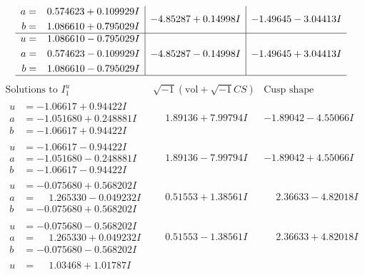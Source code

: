 \documentclass[1p]{elsarticle_modified}
\theoremstyle{definition}
\newcommand{\I}{\sqrt{-1}}
\begin{document}
$$\begin{array}{c|c|c}
\begin{aligned}
a &= \phantom{-}0.574623 + 0.109929 I \\
b &= \phantom{-}1.086610 + 0.795029 I\end{aligned}
 & -4.85287 + 0.14998 I & -1.49645 - 3.04413 I \\ \hline\begin{aligned}
u &= \phantom{-}1.086610 - 0.795029 I \\
a &= \phantom{-}0.574623 - 0.109929 I \\
b &= \phantom{-}1.086610 - 0.795029 I\end{aligned}
 & -4.85287 - 0.14998 I & -1.49645 + 3.04413 I\\
 \hline 
 \end{array}$$\newpage$$\begin{array}{c|c|c}  
\text{Solutions to }I^u_{1}& \I (\text{vol} + \sqrt{-1}CS) & \text{Cusp shape}\\
 \hline 
\begin{aligned}
u &= -1.06617 + 0.94422 I \\
a &= -1.051680 + 0.248881 I \\
b &= -1.06617 + 0.94422 I\end{aligned}
 & \phantom{-}1.89136 + 7.99794 I & -1.89042 - 4.55066 I \\ \hline\begin{aligned}
u &= -1.06617 - 0.94422 I \\
a &= -1.051680 - 0.248881 I \\
b &= -1.06617 - 0.94422 I\end{aligned}
 & \phantom{-}1.89136 - 7.99794 I & -1.89042 + 4.55066 I \\ \hline\begin{aligned}
u &= -0.075680 + 0.568202 I \\
a &= \phantom{-}1.265330 - 0.049232 I \\
b &= -0.075680 + 0.568202 I\end{aligned}
 & \phantom{-}0.51553 + 1.38561 I & \phantom{-}2.36633 - 4.82018 I \\ \hline\begin{aligned}
u &= -0.075680 - 0.568202 I \\
a &= \phantom{-}1.265330 + 0.049232 I \\
b &= -0.075680 - 0.568202 I\end{aligned}
 & \phantom{-}0.51553 - 1.38561 I & \phantom{-}2.36633 + 4.82018 I \\ \hline\begin{aligned}
u &= \phantom{-}1.03468 + 1.01787 I \\

\end{aligned}
\end{array}$$
\end{document}
